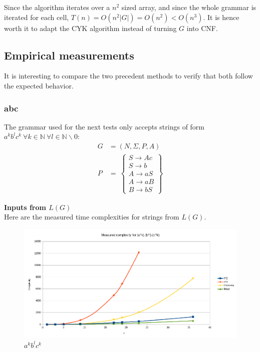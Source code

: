 \documentclass[]{article}
\begin{document}
\begin{multicols}{2}
Since the algorithm iterates over a $n^2$ sized array, and since the whole grammar is iterated for each cell, $T(n)=O(n^2|G|)=O(n^2)<O(n^3)$. It is hence worth it to adapt the CYK algorithm instead of turning $G$ into CNF.

\subsection{Empirical measurements}
It is interesting to compare the two precedent methods to verify that both follow the expected behavior.

\subsubsection{abc}
The grammar used for the next tests only accepts strings of form $a^kb^lc^k\ \forall k\in \mathbb{N}\ \forall l\in\mathbb{N}\backslash 0$:\\
\begin{align*}
  G&=(N,\Sigma,P,A)\\
  P&=\
  \left\{ \begin{array}{l}
    S\rightarrow Ac\\
    S\rightarrow b\\
    A\rightarrow aS\\
    A\rightarrow aB\\
    B\rightarrow bS
  \end{array}\right\}
\end{align*}

\end{multicols}
\newpage
\textbf{Inputs from $L(G)$}\\
Here are the measured time complexities for strings from $L(G)$.\\

\begin{figure}[h]
  \label{fig:plr}
  \includegraphics[width=\textwidth]{linear/complexity_as_bs_cs}
  \caption{$a^kb^lc^k$}
\end{figure}
\end{document}
